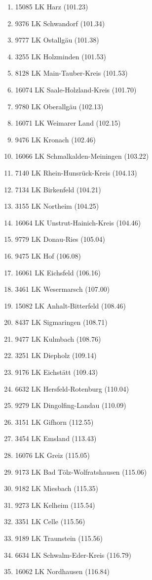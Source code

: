 \begin{enumerate}[itemsep=-6mm]
\item 15085 LK Harz (101.23)
\item 9376 LK Schwandorf (101.34)
\item 9777 LK Ostallgäu (101.38)
\item 3255 LK Holzminden (101.53)
\item 8128 LK Main-Tauber-Kreis (101.53)
\item 16074 LK Saale-Holzland-Kreis (101.70)
\item 9780 LK Oberallgäu (102.13)
\item 16071 LK Weimarer Land (102.15)
\item 9476 LK Kronach (102.46)
\item 16066 LK Schmalkalden-Meiningen (103.22)
\item 7140 LK Rhein-Hunsrück-Kreis (104.13)
\item 7134 LK Birkenfeld (104.21)
\item 3155 LK Northeim (104.25)
\item 16064 LK Unstrut-Hainich-Kreis (104.46)
\item 9779 LK Donau-Ries (105.04)
\item 9475 LK Hof (106.08)
\item 16061 LK Eichsfeld (106.16)
\item 3461 LK Wesermarsch (107.00)
\item 15082 LK Anhalt-Bitterfeld (108.46)
\item 8437 LK Sigmaringen (108.71)
\item 9477 LK Kulmbach (108.76)
\item 3251 LK Diepholz (109.14)
\item 9176 LK Eichstätt (109.43)
\item 6632 LK Hersfeld-Rotenburg (110.04)
\item 9279 LK Dingolfing-Landau (110.09)
\item 3151 LK Gifhorn (112.55)
\item 3454 LK Emsland (113.43)
\item 16076 LK Greiz (115.05)
\item 9173 LK Bad Tölz-Wolfratshausen (115.06)
\item 9182 LK Miesbach (115.35)
\item 9273 LK Kelheim (115.54)
\item 3351 LK Celle (115.56)
\item 9189 LK Traunstein (115.56)
\item 6634 LK Schwalm-Eder-Kreis (116.79)
\item 16062 LK Nordhausen (116.84)

\end{enumerate}
